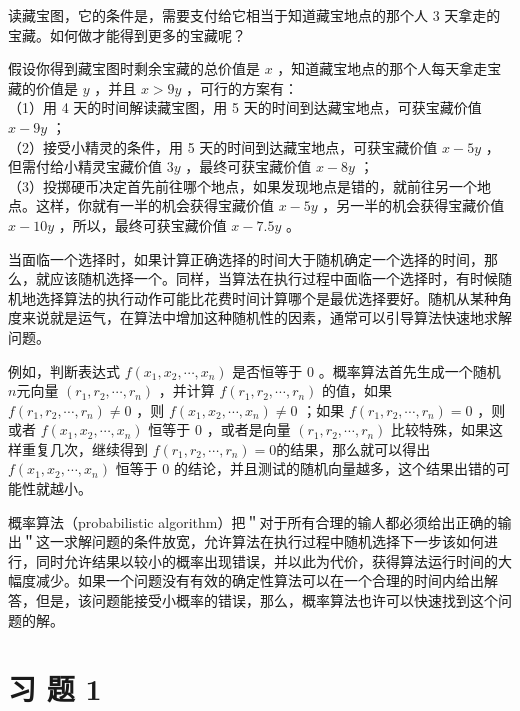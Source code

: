 \documentclass[10pt]{article}
\begin{document}
读藏宝图，它的条件是，需要支付给它相当于知道藏宝地点的那个人 3 天拿走的宝藏。如何做才能得到更多的宝藏呢？

假设你得到藏宝图时剩余宝藏的总价值是 $x$ ，知道藏宝地点的那个人每天拿走宝藏的价值是 $y$ ，并且 $x>9 y$ ，可行的方案有：\\
（1）用 4 天的时间解读藏宝图，用 5 天的时间到达藏宝地点，可获宝藏价值 $x-9 y$ ；\\
（2）接受小精灵的条件，用 5 天的时间到达藏宝地点，可获宝藏价值 $x-5 y$ ，但需付给小精灵宝藏价值 $3 y$ ，最终可获宝藏价值 $x-8 y$ ；\\
（3）投掷硬币决定首先前往哪个地点，如果发现地点是错的，就前往另一个地点。这样，你就有一半的机会获得宝藏价值 $x-5 y$ ，另一半的机会获得宝藏价值 $x-10 y$ ，所以，最终可获宝藏价值 $x-7.5 y$ 。

当面临一个选择时，如果计算正确选择的时间大于随机确定一个选择的时间，那么，就应该随机选择一个。同样，当算法在执行过程中面临一个选择时，有时候随机地选择算法的执行动作可能比花费时间计算哪个是最优选择要好。随机从某种角度来说就是运气，在算法中增加这种随机性的因素，通常可以引导算法快速地求解问题。

例如，判断表达式 $f\left(x_{1}, x_{2}, \cdots, x_{n}\right)$ 是否恒等于 0 。概率算法首先生成一个随机 $n$元向量 $\left(r_{1}, r_{2}, \cdots, r_{n}\right)$ ，并计算 $f\left(r_{1}, r_{2}, \cdots, r_{n}\right)$ 的值，如果 $f\left(r_{1}, r_{2}, \cdots, r_{n}\right) \neq 0$ ，则 $f\left(x_{1}, x_{2}, \cdots, x_{n}\right) \neq 0$ ；如果 $f\left(r_{1}, r_{2}, \cdots, r_{n}\right)=0$ ，则或者 $f\left(x_{1}, x_{2}, \cdots, x_{n}\right)$ 恒等于 0 ，或者是向量 $\left(r_{1}, r_{2}, \cdots, r_{n}\right)$ 比较特殊，如果这样重复几次，继续得到 $f\left(r_{1}, r_{2}, \cdots, r_{n}\right)=0$的结果，那么就可以得出 $f\left(x_{1}, x_{2}, \cdots, x_{n}\right)$ 恒等于 0 的结论，并且测试的随机向量越多，这个结果出错的可能性就越小。

概率算法（probabilistic algorithm）把＂对于所有合理的输人都必须给出正确的输出＂这一求解问题的条件放宽，允许算法在执行过程中随机选择下一步该如何进行，同时允许结果以较小的概率出现错误，并以此为代价，获得算法运行时间的大幅度减少。如果一个问题没有有效的确定性算法可以在一个合理的时间内给出解答，但是，该问题能接受小概率的错误，那么，概率算法也许可以快速找到这个问题的解。

\section*{习 题 1}
\end{document}
